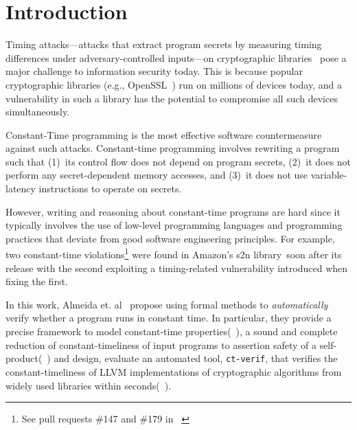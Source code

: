 \section{Introduction}

Timing attacks---attacks that extract program secrets by measuring timing differences under adversary-controlled inputs---on cryptographic libraries~\cite{bernstein_cache_timing_attacks, dsa_exponentiations} pose a major challenge to information security today. 
This is because popular cryptographic libraries (e.g., OpenSSL~\cite{openssl}) run on millions of devices today, and a vulnerability in such a library has the potential to compromise all such devices simultaneously.

Constant-Time programming is the most effective software countermeasure against such attacks.
Constant-time programming involves rewriting a program such that (1)~its control flow does not depend on program secrets, (2)~it does not perform any secret-dependent memory accesses, and (3)~it does not use variable-latency instructions to operate on secrets.

However, writing and reasoning about constant-time programs are hard since it typically involves the use of low-level programming languages and programming practices that deviate from good software engineering principles.
For example, two constant-time violations\footnote{See pull requests \#147 and \#179 in ~\cite{s2n}} were found in Amazon's s2n library~\cite{s2n}soon after its release with the second exploiting a timing-related vulnerability introduced when fixing the first.

In this work, Almeida et. al~\cite{almeida} propose using formal methods to \emph{automatically} verify whether a program runs in constant time. 
In particular, they provide a precise framework to model constant-time properties(~), a sound and complete reduction of constant-timeliness of input programs to assertion safety of a self-product(~) and design, evaluate an automated tool, \texttt{ct-verif}, that verifies the constant-timeliness of LLVM implementations of cryptographic algorithms from widely used libraries within seconds(~). 
